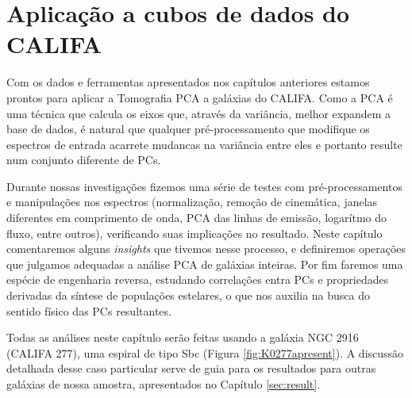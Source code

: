 



\chapter{Aplicação a cubos de dados do CALIFA}
\label{sec:PCAaplic}

Com os dados e ferramentas apresentados nos capítulos anteriores estamos prontos para aplicar a Tomografia PCA a
galáxias do CALIFA. Como a PCA é uma técnica que calcula os eixos que, através da variância, melhor expandem a base de
dados, é natural que qualquer pré-processamento que modifique os espectros de entrada acarrete mudancas na variância
entre eles e portanto resulte num conjunto diferente de PCs. 

Durante nossas investigações fizemos uma série de testes com pré-processamentos e manipulações nos espectros
(normalização, remoção de cinemática, janelas diferentes em comprimento de onda, PCA das linhas de emissão, logarítmo do
fluxo, entre outros), verificando suas implicações no resultado. Neste capítulo comentaremos alguns {\em insights} que
tivemos nesse processo, e definiremos operações que julgamos adequadas a análise PCA de galáxias inteiras. Por fim
faremos uma espécie de engenharia reversa, estudando correlações entra PCs e propriedades derivadas da síntese de
populações estelares, o que nos auxilia na busca do sentido físico das PCs resultantes.

Todas as análises neste capítulo serão feitas usando a galáxia NGC 2916 (CALIFA 277), uma espiral de tipo Sbc (Figura
\ref{fig:K0277apresent}). A discussão detalhada desse caso particular serve de guia para os resultados para outras
galáxias de nossa amostra, apresentados no Capítulo \ref{sec:result}.

